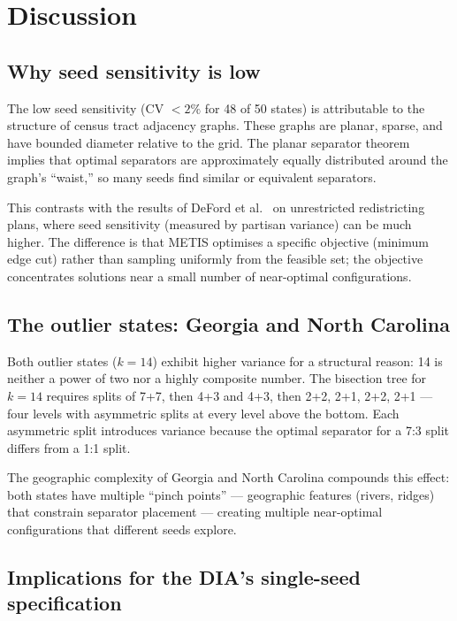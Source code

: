\section{Discussion}
\label{sec:discussion}

\subsection{Why seed sensitivity is low}

The low seed sensitivity (CV $< 2\%$ for 48 of 50 states) is attributable
to the structure of census tract adjacency graphs.  These graphs are planar,
sparse, and have bounded diameter relative to the grid.  The planar separator
theorem~\citep{lipton1979separator,b6paper} implies that optimal separators
are approximately equally distributed around the graph's ``waist,'' so many
seeds find similar or equivalent separators.

This contrasts with the results of DeFord et al.~\citep{deford2019recombination}
on unrestricted redistricting plans, where seed sensitivity (measured by
partisan variance) can be much higher.  The difference is that METIS
optimises a specific objective (minimum edge cut) rather than sampling
uniformly from the feasible set; the objective concentrates solutions
near a small number of near-optimal configurations.

\subsection{The outlier states: Georgia and North Carolina}

Both outlier states ($k = 14$) exhibit higher variance for a structural
reason: 14 is neither a power of two nor a highly composite number.
The bisection tree for $k = 14$ requires splits of 7+7, then 4+3 and 4+3,
then 2+2, 2+1, 2+2, 2+1 --- four levels with asymmetric splits at every
level above the bottom.  Each asymmetric split introduces variance because
the optimal separator for a 7:3 split differs from a 1:1 split.

The geographic complexity of Georgia and North Carolina compounds this
effect: both states have multiple ``pinch points'' --- geographic features
(rivers, ridges) that constrain separator placement --- creating multiple
near-optimal configurations that different seeds explore.

\subsection{Implications for the DIA's single-seed specification}

